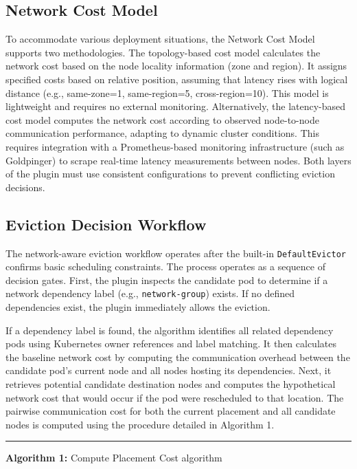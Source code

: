 \subsection{Network Cost Model}
To accommodate various deployment situations, the Network Cost Model supports two methodologies. The topology-based cost model calculates the network cost based on the node locality information (zone and region). It assigns specified costs based on relative position, assuming that latency rises with logical distance (e.g., same-zone=1, same-region=5, cross-region=10). This model is lightweight and requires no external monitoring. Alternatively, the latency-based cost model computes the network cost according to observed node-to-node communication performance, adapting to dynamic cluster conditions. This requires integration with a Prometheus-based monitoring infrastructure (such as Goldpinger) to scrape real-time latency measurements between nodes. Both layers of the plugin must use consistent configurations to prevent conflicting eviction decisions.

\subsection{Eviction Decision Workflow}
The network-aware eviction workflow operates after the built-in \texttt{DefaultEvictor} confirms basic scheduling constraints. The process operates as a sequence of decision gates. First, the plugin inspects the candidate pod to determine if a network dependency label (e.g., \texttt{network-group}) exists. If no defined dependencies exist, the plugin immediately allows the eviction.

If a dependency label is found, the algorithm identifies all related dependency pods using Kubernetes owner references and label matching. It then calculates the baseline network cost by computing the communication overhead between the candidate pod's current node and all nodes hosting its dependencies. Next, it retrieves potential candidate destination nodes and computes the hypothetical network cost that would occur if the pod were rescheduled to that location. The pairwise communication cost for both the current placement and all candidate nodes is computed using the procedure detailed in Algorithm 1.

\vspace{0.5em}
\noindent\rule{\linewidth}{0.4pt}
\textbf{Algorithm 1:} Compute Placement Cost algorithm
\vspace{-0.5em}

